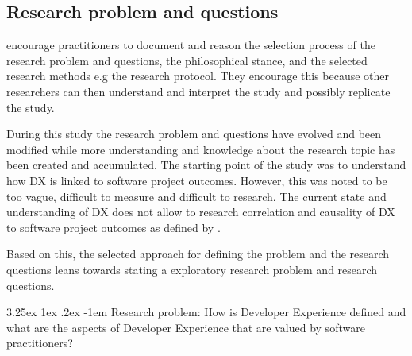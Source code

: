 \documentclass[english, 12pt, a4paper, sci, utf8, a-1b, online]{aaltothesis}
\makeatletter
\renewcommand\paragraph{\@startsection{paragraph}{5}{\z@}%
  {3.25ex \@plus1ex \@minus.2ex}%
  {-1em}%
  {\normalfont\normalsize\bfseries}}
\makeatother
\begin{document}
\subsection{Research problem and questions}

\textcite{easterbrook2008selecting} encourage practitioners to document and reason the selection process of the research problem and questions, the philosophical stance, and the selected research methods e.g the research protocol. They encourage this because other researchers can then understand and interpret the study and possibly replicate the study.

During this study the research problem and questions have evolved and been modified while more understanding and knowledge about the research topic has been created and accumulated. The starting point of the study was to understand how DX is linked to software project outcomes. However, this was noted to be too vague, difficult to measure and difficult to research. The current state and understanding of DX does not allow to research correlation and causality of DX to software project outcomes as defined by \textcite{easterbrook2008selecting}.

Based on this, the selected approach for defining the problem and the research questions leans towards stating a exploratory research problem and research questions.

\newcommand{\researchproblem}{How is Developer Experience defined and what are the aspects of Developer Experience that are valued by software practitioners?}

\paragraph{Research problem:} \researchproblem

\newcommand{\rqone}{What is the definition and aspects of Developer Experience, and how do they differ between scientific literature and literature written by practitioners?}
\newcommand{\rqonepointone}{What objects/entities have been studied with respect to developer experience?}
\newcommand{\rqonepointtwo}{What methods have been used to study developer experience?}
\newcommand{\rqonepointthree}{What are the main results of the existing research on developer experience?}
\newcommand{\rqonepointfour}{What is known about factors that improve or worsen developer experience?}
\newcommand{\rqonepointfive}{What are the definitions given to developer experience?}
\newcommand{\rqonepointsix}{From what contexts is developer experience looked at from?}
\newcommand{\rqtwo}{How is developer experience and its aspects defined by different roles (or software developers) in a software consultancy company?}
\newcommand{\rqtwopointone}{What different experience objects of Developer Experience are there in the software consultancy company?}
\newcommand{\rqtwopointtwo}{What factors related to the experience object improves or worsens the developer dxperience?}
\newcommand{\rqtwopointthree}{How the developer experience of the experience objects be improved?}
\end{document}
